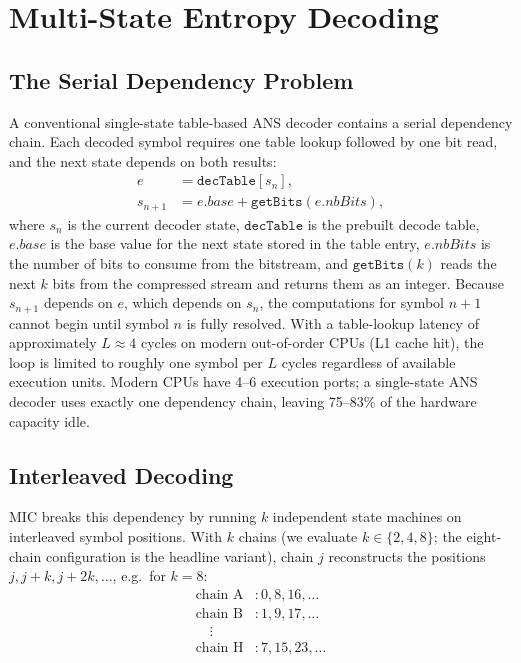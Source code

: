 \documentclass[journal]{IEEEtran}
\begin{document}
\section{Multi-State Entropy Decoding}
\label{sec:multistate}

\subsection{The Serial Dependency Problem}

A conventional single-state table-based ANS decoder contains a serial
dependency chain. Each decoded symbol requires one table lookup followed by
one bit read, and the next state depends on both results:
\begin{equation}
\begin{aligned}
  e &= \texttt{decTable}[s_n], \\
  s_{n+1} &= e.\textit{base} + \texttt{getBits}(e.\textit{nbBits}),
\end{aligned}
\end{equation}
where $s_n$ is the current decoder state, $\texttt{decTable}$ is the
prebuilt decode table, $e.\textit{base}$ is the base value for the next
state stored in the table entry, $e.\textit{nbBits}$ is the number of bits
to consume from the bitstream, and $\texttt{getBits}(k)$ reads the next $k$
bits from the compressed stream and returns them as an integer.
Because $s_{n+1}$ depends on $e$, which depends on $s_n$, the computations
for symbol $n+1$ cannot begin until symbol $n$ is fully resolved.
With a table-lookup latency of approximately $L \approx 4$ cycles on modern
out-of-order CPUs (L1 cache hit), the loop is limited to roughly one symbol per
$L$ cycles regardless of available execution units. Modern CPUs have 4--6
execution ports; a single-state ANS decoder uses exactly one dependency chain,
leaving 75--83\% of the hardware capacity idle.

\subsection{Interleaved Decoding}

MIC breaks this dependency by running $k$ independent state machines on
interleaved symbol positions. With $k$ chains (we evaluate $k\in\{2,4,8\}$;
the eight-chain configuration is the headline variant), chain $j$
reconstructs the positions $j, j+k, j+2k, \ldots$, e.g.\ for $k=8$:
\begin{align*}
  \text{chain A}&: 0, 8, 16, \ldots \\
  \text{chain B}&: 1, 9, 17, \ldots \\
  \quad \vdots\ &\\
  \text{chain H}&: 7, 15, 23, \ldots
\end{align*}
\end{document}
